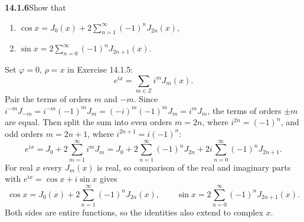 \par\bigskip
\noindent\textbf{14.1.6}\quad Show that
\begin{enumerate}
\item[(a)] $\cos x=J_{0}(x)+2\displaystyle\sum_{n=1}^{\infty}
(-1)^{n}J_{2n}(x)$,
\item[(b)] $\sin x=2\displaystyle\sum_{n=0}^{\infty}(-1)^{n}J_{2n+1}(x)$.
\end{enumerate}
\solution
Set $\varphi=0$, $\rho=x$ in Exercise 14.1.5:
\[
e^{ix}=\sum_{m\in\mathbb Z}i^mJ_m(x).
\]
Pair the terms of orders $m$ and $-m$. Since
$i^{-m}J_{-m}=i^{-m}(-1)^mJ_m=(-i)^m(-1)^mJ_m=i^mJ_m$,
the terms of orders $\pm m$ are equal. Then split the sum into even
orders $m=2n$, where $i^{2n}=(-1)^n$, and odd orders $m=2n+1$, where
$i^{2n+1}=i(-1)^n$:
\[
e^{ix}=J_0+2\sum_{m=1}^{\infty}i^mJ_m
=J_0+2\sum_{n=1}^{\infty}(-1)^nJ_{2n}
+2i\sum_{n=0}^{\infty}(-1)^nJ_{2n+1}.
\]
For real $x$ every $J_m(x)$ is real, so comparison of the real and
imaginary parts with $e^{ix}=\cos x+i\sin x$ gives
\[
\boxed{\cos x=J_0(x)+2\sum_{n=1}^{\infty}(-1)^nJ_{2n}(x)},
\qquad
\boxed{\sin x=2\sum_{n=0}^{\infty}(-1)^nJ_{2n+1}(x)}.
\]
Both sides are entire functions, so the identities also extend to
complex $x$.

